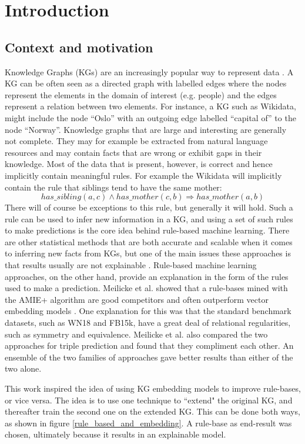 \chapter{Introduction}
\section{Context and motivation}
Knowledge Graphs (KGs) are an increasingly popular way to represent data \cite{hogan2020knowledge}.
A KG can be often seen as a directed graph with labelled edges where the nodes represent the elements in the domain of interest (e.g. people) and the edges represent a relation between two elements. For instance, a KG such as Wikidata, might include the node ``Oslo'' with an outgoing edge labelled ``capital of'' to the node ``Norway''. Knowledge graphs that are large and interesting are generally not complete. They may for example be extracted from natural language resources and may contain facts that are wrong or exhibit gaps in their knowledge. Most of the data that is present, however, is correct and hence implicitly contain meaningful rules. For example the Wikidata will implicitly contain the rule that siblings tend to have the same mother:
\[has\_sibling(a, c) \wedge has\_mother(c, b) \Rightarrow has\_mother(a, b)\]
There will of course be exceptions to this rule, but generally it will hold. Such a rule can be used to infer new information in a KG, and using a set of such rules to make predictions is the core idea behind rule-based machine learning. There are other statistical methods that are both accurate and scalable when it comes to inferring new facts from KGs, but one of the main issues these approaches is that results usually are not explainable \cite{bonatti2019knowledge}. Rule-based machine learning approaches, on the other hand, provide an explanation in the form of the rules used to make a prediction. Meilicke et al. showed that a rule-bases mined with the AMIE+ algorithm are good competitors and often outperform vector embedding models \cite{ensemble}. One explanation for this was that the standard benchmark datasets, such as WN18 and FB15k,  have a great deal of relational regularities, such as symmetry and equivalence. Meilicke et al. also compared the two approaches for triple prediction and found that they compliment each other. An ensemble of the two families of approaches gave better results than either of the two alone.

This work inspired the idea of using KG embedding models to improve rule-bases, or vice versa. The idea is to use one technique to ``extend" the original KG, and thereafter train the second one on the extended KG. This can be done both ways, as shown in figure \ref{rule_based_and_embedding}. A rule-base as end-result was chosen, ultimately because it results in an explainable model. 

